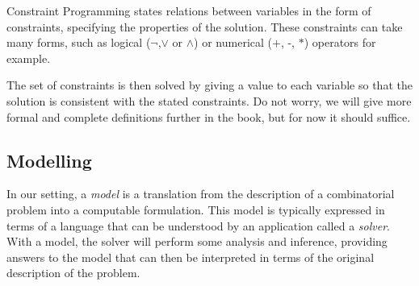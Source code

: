Constraint Programming states relations between variables in the form of
constraints, specifying the properties of the solution. These constraints can
take many forms, such as logical ($\neg$,$\vee$ or $\wedge$) or numerical (+,
-, $*$) operators for example.

The set of constraints is then solved by giving a value to each variable so
that the solution is consistent with the stated constraints.  Do not worry, we
will give more formal and complete definitions further in the book, but for now
it should suffice.

\subsection{Modelling}

In our setting, a \emph{model} is a translation from the description of a
combinatorial problem into a computable formulation. This model is typically
expressed in terms of a language that can be understood by an application
called a \emph{solver}. With a model, the solver will perform some analysis and
inference, providing answers to the model that can then be interpreted
in terms of the original description of the problem. 

